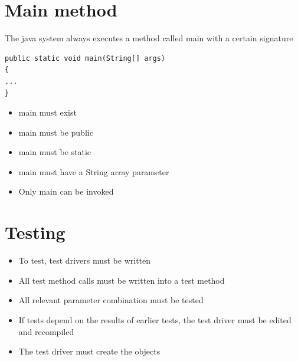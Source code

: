 \documentclass{article}[18pt]
\begin{document}
\section{Main method}
The java system always executes a method called main with a certain signature
\begin{verbatim}
public static void main(String[] args)
{
...
}
\end{verbatim}
\begin{itemize}
	\item main must exist
	\item main must be public
	\item main must be static
	\item main must have a String array parameter
	\item Only main can be invoked
\end{itemize}
\section{Testing}
\begin{itemize}
	\item To test, test drivers must be written
	\item All test method calls must be written into a test method
	\item All relevant parameter combination must be tested
	\item If tests depend on the results of earlier tests, the test driver must be edited and recompiled
	\item The test driver must create the objects
\end{itemize}
\end{document}
